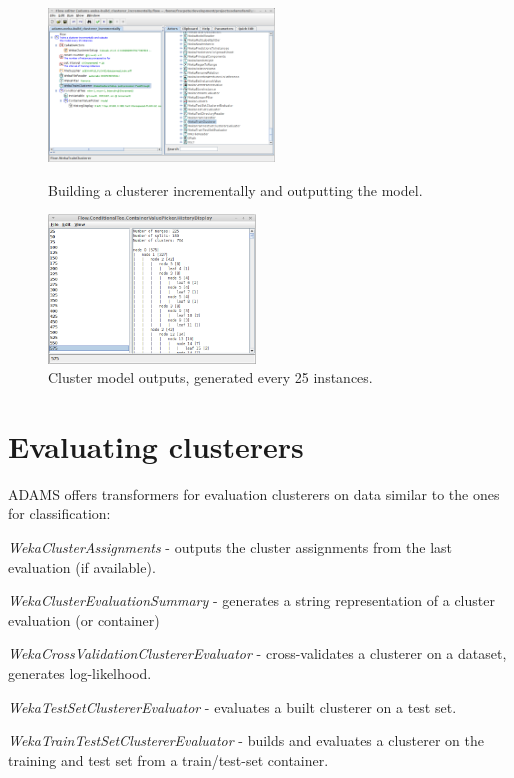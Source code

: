 \begin{figure}[ht]
  \begin{minipage}[t]{0.5\linewidth}
    \centering
    \includegraphics[width=6.0cm]{images/build_clusterer_incrementally-flow.png}
    \caption{Building a clusterer incrementally and outputting the model.}
    \label{build_clusterer_incrementally-flow}
  \end{minipage}
  \hspace{0.5cm}
  \begin{minipage}[t]{0.5\linewidth}
    \centering
    \includegraphics[width=5.5cm]{images/build_clusterer_incrementally-output.png}
    \caption{Cluster model outputs, generated every 25 instances.}
    \label{build_clusterer_incrementally-output}
  \end{minipage}
\end{figure}

\section{Evaluating clusterers}
ADAMS offers transformers for evaluation clusterers on data similar to the 
ones for classification:
\begin{tight_itemize}
	\item \textit{WekaClusterAssignments} - outputs the cluster assignments
	from the last evaluation (if available).
	\item \textit{WekaClusterEvaluationSummary} - generates a string representation
	of a cluster evaluation (or container)
	\item \textit{WekaCrossValidationClustererEvaluator} - cross-validates a
	clusterer on a dataset, generates log-likelhood.
	\item \textit{WekaTestSetClustererEvaluator} - evaluates a built clusterer
	on a test set.
	\item \textit{WekaTrainTestSetClustererEvaluator} - builds and evaluates
	a clusterer on the training and test set from a train/test-set container.
\end{tight_itemize}

